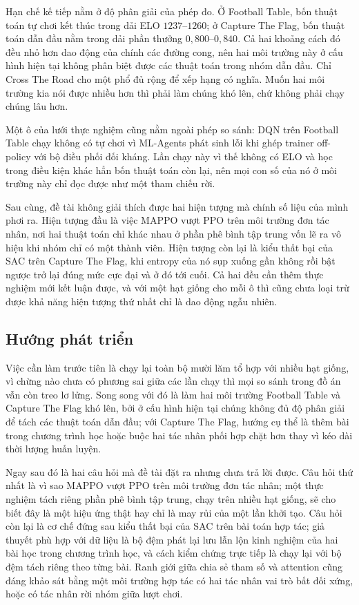 \indent Hạn chế kế tiếp nằm ở độ phân giải của phép đo. Ở Football Table, bốn thuật toán
tự chơi kết thúc trong dải ELO $1237$--$1260$; ở Capture The Flag, bốn thuật toán dẫn đầu
nằm trong dải phần thưởng $0{,}800$--$0{,}840$. Cả hai khoảng cách đó đều nhỏ hơn dao
động của chính các đường cong, nên hai môi trường này ở cấu hình hiện tại không phân biệt
được các thuật toán trong nhóm dẫn đầu. Chỉ Cross The Road cho một phổ đủ rộng để xếp
hạng có nghĩa. Muốn hai môi trường kia nói được nhiều hơn thì phải làm chúng khó lên, chứ
không phải chạy chúng lâu hơn.

\indent Một ô của lưới thực nghiệm cũng nằm ngoài phép so sánh: DQN trên Football Table
chạy không có tự chơi vì ML-Agents phát sinh lỗi khi ghép trainer off-policy với bộ điều
phối đối kháng. Lần chạy này vì thế không có ELO và học trong điều kiện khác hẳn bốn
thuật toán còn lại, nên mọi con số của nó ở môi trường này chỉ đọc được như một tham
chiếu rời.

\indent Sau cùng, đề tài không giải thích được hai hiện tượng mà chính số liệu của mình
phơi ra. Hiện tượng đầu là việc MAPPO vượt PPO trên môi trường đơn tác nhân, nơi hai
thuật toán chỉ khác nhau ở phần phê bình tập trung vốn lẽ ra vô hiệu khi nhóm chỉ có một
thành viên. Hiện tượng còn lại là kiểu thất bại của SAC trên Capture The Flag, khi
entropy của nó sụp xuống gần không rồi bật ngược trở lại đúng mức cực đại và ở đó tới
cuối. Cả hai đều cần thêm thực nghiệm mới kết luận được, và với một hạt giống cho mỗi ô
thì cũng chưa loại trừ được khả năng hiện tượng thứ nhất chỉ là dao động ngẫu nhiên.

\subsection{Hướng phát triển}
\indent Việc cần làm trước tiên là chạy lại toàn bộ mười lăm tổ hợp với nhiều hạt giống,
vì chừng nào chưa có phương sai giữa các lần chạy thì mọi so sánh trong đồ án vẫn còn
treo lơ lửng. Song song với đó là làm hai môi trường Football Table và Capture The Flag
khó lên, bởi ở cấu hình hiện tại chúng không đủ độ phân giải để tách các thuật toán dẫn
đầu; với Capture The Flag, hướng cụ thể là thêm bài trong chương trình học hoặc buộc hai
tác nhân phối hợp chặt hơn thay vì kéo dài thời lượng huấn luyện.

\indent Ngay sau đó là hai câu hỏi mà đề tài đặt ra nhưng chưa trả lời được. Câu hỏi thứ
nhất là vì sao MAPPO vượt PPO trên môi trường đơn tác nhân; một thực nghiệm tách riêng
phần phê bình tập trung, chạy trên nhiều hạt giống, sẽ cho biết đây là một hiệu ứng thật
hay chỉ là may rủi của một lần khởi tạo. Câu hỏi còn lại là cơ chế đứng sau kiểu thất bại
của SAC trên bài toán hợp tác; giả thuyết phù hợp với dữ liệu là bộ đệm phát lại lưu lẫn
lộn kinh nghiệm của hai bài học trong chương trình học, và cách kiểm chứng trực tiếp là
chạy lại với bộ đệm tách riêng theo từng bài. Ranh giới giữa chia sẻ tham số và attention
cũng đáng khảo sát bằng một môi trường hợp tác có hai tác nhân vai trò bất đối xứng, hoặc
có tác nhân rời nhóm giữa lượt chơi.

